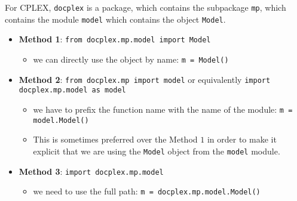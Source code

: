 \documentclass[12pt]{article}
\begin{document}
For CPLEX, \texttt{docplex} is a package, which contains the subpackage \texttt{mp}, which contains the module \texttt{model} which contains the object \texttt{Model}.
\begin{itemize}
    \item \textbf{Method 1}: \texttt{from docplex.mp.model import Model}
        \begin{itemize}
            \item we can directly use the object by name: \texttt{m = Model()}
        \end{itemize}
    \item \textbf{Method 2}: \texttt{from docplex.mp import model} or equivalently \texttt{import docplex.mp.model as model}
        \begin{itemize}
            \item we have to prefix the function name with the name of the module: \texttt{m = model.Model()}
            \item This is sometimes preferred over the Method $1$ in order to make it explicit that we are using the \texttt{Model} object from the \texttt{model} module.
        \end{itemize}
    \item \textbf{Method 3}: \texttt{import docplex.mp.model}
        \begin{itemize}
            \item we need to use the full path: \texttt{m = docplex.mp.model.Model()}
        \end{itemize}
\end{itemize}

\printbibliography






\end{document}
